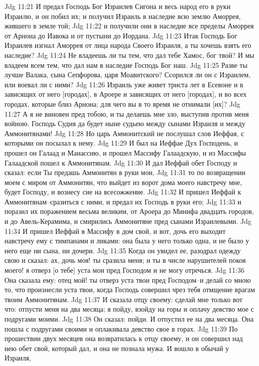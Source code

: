 Jdg 11:21  И предал Господь Бог Израилев Сигона и весь народ его в руки Израилю, и он побил их; и получил Израиль в наследие всю землю Аморрея, жившего в земле той;
Jdg 11:22  и получили они в наследие все пределы Аморрея от Арнона до Иавока и от пустыни до Иордана.
Jdg 11:23  Итак Господь Бог Израилев изгнал Аморрея от лица народа Своего Израиля, а ты хочешь взять его наследие?
Jdg 11:24  Не владеешь ли ты тем, что дал тебе Хамос, бог твой? И мы владеем всем тем, что дал нам в наследие Господь Бог наш.
Jdg 11:25  Разве ты лучше Валака, сына Сепфорова, царя Моавитского? Ссорился ли он с Израилем, или воевал ли с ними?
Jdg 11:26  Израиль уже живет триста лет в Есевоне и в зависящих от него [городах], в Ароере и зависящих от него [городах], и во всех городах, которые близ Арнона; для чего вы в то время не отнимали [их]?
Jdg 11:27  А я не виновен пред тобою, и ты делаешь мне зло, выступив против меня войною. Господь Судия да будет ныне судьею между сынами Израиля и между Аммонитянами!
Jdg 11:28  Но царь Аммонитский не послушал слов Иеффая, с которыми он посылал к нему.
Jdg 11:29  И был на Иеффае Дух Господень, и прошел он Галаад и Манассию, и прошел Массифу Галаадскую, и из Массифы Галаадской пошел к Аммонитянам.
Jdg 11:30  И дал Иеффай обет Господу и сказал: если Ты предашь Аммонитян в руки мои,
Jdg 11:31  то по возвращении моем с миром от Аммонитян, что выйдет из ворот дома моего навстречу мне, будет Господу, и вознесу сие на всесожжение.
Jdg 11:32  И пришел Иеффай к Аммонитянам--сразиться с ними, и предал их Господь в руки его;
Jdg 11:33  и поразил их поражением весьма великим, от Ароера до Минифа двадцать городов, и до Авель-Керамима, и смирились Аммонитяне пред сынами Израилевыми.
Jdg 11:34  И пришел Иеффай в Массифу в дом свой, и вот, дочь его выходит навстречу ему с тимпанами и ликами: она была у него только одна, и не было у него еще ни сына, ни дочери.
Jdg 11:35  Когда он увидел ее, разодрал одежду свою и сказал: ах, дочь моя! ты сразила меня; и ты в числе нарушителей покоя моего! я отверз [о тебе] уста мои пред Господом и не могу отречься.
Jdg 11:36  Она сказала ему: отец мой! ты отверз уста твои пред Господом--и делай со мною то, что произнесли уста твои, когда Господь совершил чрез тебя отмщение врагам твоим Аммонитянам.
Jdg 11:37  И сказала отцу своему: сделай мне только вот что: отпусти меня на два месяца; я пойду, взойду на горы и оплачу девство мое с подругами моими.
Jdg 11:38  Он сказал: пойди. И отпустил ее на два месяца. Она пошла с подругами своими и оплакивала девство свое в горах.
Jdg 11:39  По прошествии двух месяцев она возвратилась к отцу своему, и он совершил над нею обет свой, который дал, и она не познала мужа. И вошло в обычай у Израиля,
